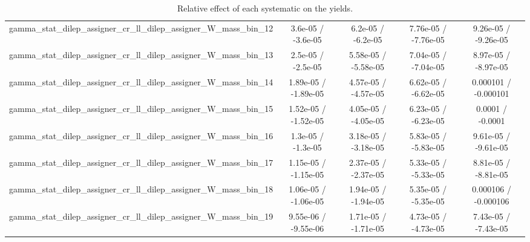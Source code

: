 \documentclass[10pt]{article}
\begin{document}
\begin{table}[htbp]
\begin{center}
\begin{tabular}{|c|c|c|c|c|}
  gamma_stat_dilep_assigner_cr_ll_dilep_assigner_W_mass_bin_12 & 3.6e-05 / -3.6e-05 & 6.2e-05 / -6.2e-05 & 7.76e-05 / -7.76e-05 & 9.26e-05 / -9.26e-05 \\ 
  gamma_stat_dilep_assigner_cr_ll_dilep_assigner_W_mass_bin_13 & 2.5e-05 / -2.5e-05 & 5.58e-05 / -5.58e-05 & 7.04e-05 / -7.04e-05 & 8.97e-05 / -8.97e-05 \\ 
  gamma_stat_dilep_assigner_cr_ll_dilep_assigner_W_mass_bin_14 & 1.89e-05 / -1.89e-05 & 4.57e-05 / -4.57e-05 & 6.62e-05 / -6.62e-05 & 0.000101 / -0.000101 \\ 
  gamma_stat_dilep_assigner_cr_ll_dilep_assigner_W_mass_bin_15 & 1.52e-05 / -1.52e-05 & 4.05e-05 / -4.05e-05 & 6.23e-05 / -6.23e-05 & 0.0001 / -0.0001 \\ 
  gamma_stat_dilep_assigner_cr_ll_dilep_assigner_W_mass_bin_16 & 1.3e-05 / -1.3e-05 & 3.18e-05 / -3.18e-05 & 5.83e-05 / -5.83e-05 & 9.61e-05 / -9.61e-05 \\ 
  gamma_stat_dilep_assigner_cr_ll_dilep_assigner_W_mass_bin_17 & 1.15e-05 / -1.15e-05 & 2.37e-05 / -2.37e-05 & 5.33e-05 / -5.33e-05 & 8.81e-05 / -8.81e-05 \\ 
  gamma_stat_dilep_assigner_cr_ll_dilep_assigner_W_mass_bin_18 & 1.06e-05 / -1.06e-05 & 1.94e-05 / -1.94e-05 & 5.35e-05 / -5.35e-05 & 0.000106 / -0.000106 \\ 
  gamma_stat_dilep_assigner_cr_ll_dilep_assigner_W_mass_bin_19 & 9.55e-06 / -9.55e-06 & 1.71e-05 / -1.71e-05 & 4.73e-05 / -4.73e-05 & 7.43e-05 / -7.43e-05 \\ 
\hline 
\end{tabular} 
\caption{Relative effect of each systematic on the yields.} 
\end{center} 
\end{table} 
\end{document}
